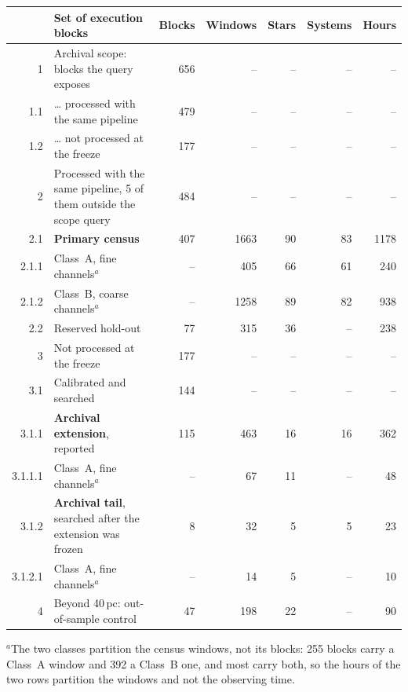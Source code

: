 \begin{tabular}{@{}r@{~}p{}rrrrr@{}}
\hline
 & Set of execution blocks & Blocks & Windows & Stars & Systems & Hours \\
\hline
1 & Archival scope: blocks the query exposes & 656 & -- & -- & -- & -- \\
1.1 & \hspace{0.8em}\ldots{} processed with the same pipeline & 479 & -- & -- & -- & -- \\
1.2 & \hspace{0.8em}\ldots{} not processed at the freeze & 177 & -- & -- & -- & -- \\
\hline
2 & Processed with the same pipeline, 5 of them outside the scope query & 484 & -- & -- & -- & -- \\
2.1 & \hspace{0.8em}\textbf{Primary census} & 407 & 1663 & 90 & 83 & 1178 \\
2.1.1 & \hspace{1.6em}Class~A, fine channels$^{a}$ & -- & 405 & 66 & 61 & 240 \\
2.1.2 & \hspace{1.6em}Class~B, coarse channels$^{a}$ & -- & 1258 & 89 & 82 & 938 \\
2.2 & \hspace{0.8em}Reserved hold-out & 77 & 315 & 36 & -- & 238 \\
\hline
3 & Not processed at the freeze & 177 & -- & -- & -- & -- \\
3.1 & \hspace{0.8em}Calibrated and searched & 144 & -- & -- & -- & -- \\
3.1.1 & \hspace{1.6em}\textbf{Archival extension}, reported & 115 & 463 & 16 & 16 & 362 \\
3.1.1.1 & \hspace{2.4em}Class~A, fine channels$^{a}$ & -- & 67 & 11 & -- & 48 \\
3.1.2 & \hspace{1.6em}\textbf{Archival tail}, searched after the extension was frozen & 8 & 32 & 5 & 5 & 23 \\
3.1.2.1 & \hspace{2.4em}Class~A, fine channels$^{a}$ & -- & 14 & 5 & -- & 10 \\
\hline
4 & Beyond 40\,pc: out-of-sample control & 47 & 198 & 22 & -- & 90 \\
\hline
\end{tabular}

{\footnotesize\raggedright $^{a}$The two classes partition the census windows, not its blocks: 255 blocks carry a Class~A window and 392 a Class~B one, and most carry both, so the hours of the two rows partition the windows and not the observing time.}
